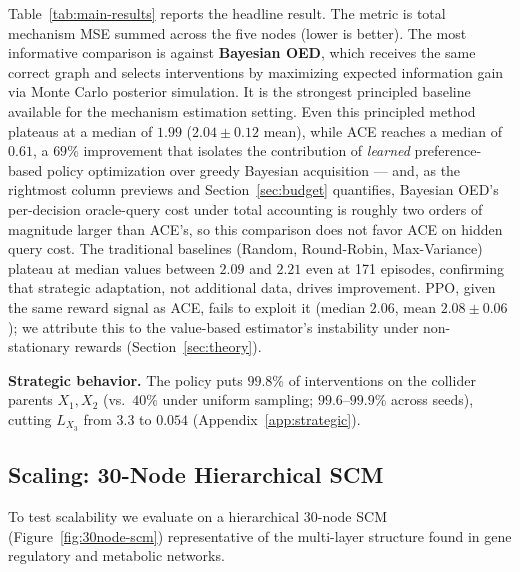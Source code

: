 \documentclass[twoside]{article}
\theoremstyle{plain}
\theoremstyle{definition}
\theoremstyle{remark}
\begin{document}
Table~\ref{tab:main-results} reports the headline result. The metric is total mechanism MSE summed across the five nodes (lower is better). The most informative comparison is against \textbf{Bayesian OED}, which receives the same correct graph and selects interventions by maximizing expected information gain via Monte Carlo posterior simulation. It is the strongest principled baseline available for the mechanism estimation setting. Even this principled method plateaus at a median of $1.99$ ($2.04 \pm 0.12$ mean), while ACE reaches a median of $0.61$, a $69\%$ improvement that isolates the contribution of \emph{learned} preference-based policy optimization over greedy Bayesian acquisition --- and, as the rightmost column previews and Section~\ref{sec:budget} quantifies, Bayesian OED's per-decision oracle-query cost under total accounting is roughly two orders of magnitude larger than ACE's, so this comparison does not favor ACE on hidden query cost. The traditional baselines (Random, Round-Robin, Max-Variance) plateau at median values between $2.09$ and $2.21$ even at 171 episodes, confirming that strategic adaptation, not additional data, drives improvement. PPO, given the same reward signal as ACE, fails to exploit it (median $2.06$, mean $2.08 \pm 0.06$); we attribute this to the value-based estimator's instability under non-stationary rewards (Section~\ref{sec:theory}).

\textbf{Strategic behavior.} The policy puts $99.8\%$ of interventions on the collider parents $X_1,X_2$ (vs.\ $40\%$ under uniform sampling; $99.6$--$99.9\%$ across seeds), cutting $L_{X_3}$ from $3.3$ to $0.054$ (Appendix~\ref{app:strategic}).

\subsection{Scaling: 30-Node Hierarchical SCM}
\label{sec:results-scale}

To test scalability we evaluate on a hierarchical 30-node SCM (Figure~\ref{fig:30node-scm}) representative of the multi-layer structure found in gene regulatory and metabolic networks.
\end{document}
